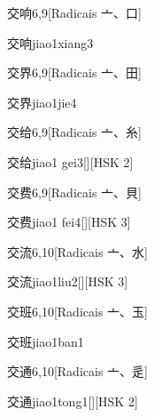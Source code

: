 \begin{entry}{交响}{6,9}[Radicais ⼇、⼝]
  \begin{phonetics}{交响}{jiao1xiang3}
  \end{phonetics}
\end{entry}

\begin{entry}{交界}{6,9}[Radicais ⼇、⽥]
  \begin{phonetics}{交界}{jiao1jie4}
  \end{phonetics}
\end{entry}

\begin{entry}{交给}{6,9}[Radicais ⼇、⽷]
  \begin{phonetics}{交给}{jiao1 gei3}[][HSK 2]
  \end{phonetics}
\end{entry}

\begin{entry}{交费}{6,9}[Radicais ⼇、⾙]
  \begin{phonetics}{交费}{jiao1 fei4}[][HSK 3]
  \end{phonetics}
\end{entry}

\begin{entry}{交流}{6,10}[Radicais ⼇、⽔]
  \begin{phonetics}{交流}{jiao1liu2}[][HSK 3]
  \end{phonetics}
\end{entry}

\begin{entry}{交班}{6,10}[Radicais ⼇、⽟]
  \begin{phonetics}{交班}{jiao1ban1}
  \end{phonetics}
\end{entry}

\begin{entry}{交通}{6,10}[Radicais ⼇、⾡]
  \begin{phonetics}{交通}{jiao1tong1}[][HSK 2]
  \end{phonetics}
\end{entry}

